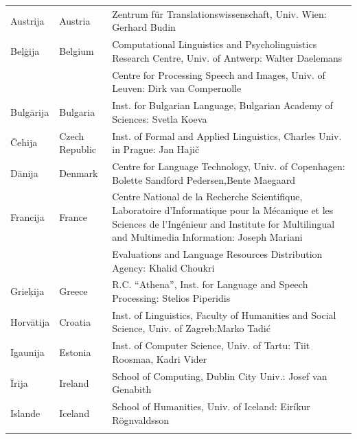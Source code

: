  \label{metanetmembers}
\small
\begin{longtable}{@{}llp{113mm}@{}}
  Austrija & \textcolor{grey1}{Austria} & Zentrum für Translationswissenschaft, Univ. Wien: Gerhard Budin\\ \addlinespace 
  Beļģija & \textcolor{grey1}{Belgium} & Computational Linguistics and Psycholinguistics Research Centre, Univ. of Antwerp: Walter Daelemans\\ \addlinespace
  & & Centre for Processing Speech and Images, Univ. of Leuven: Dirk van Compernolle \\ \addlinespace
  Bulgārija & \textcolor{grey1}{Bulgaria} & Inst. for Bulgarian Language, Bulgarian Academy of Sciences: Svetla Koeva \\ \addlinespace
  Čehija & \textcolor{grey1}{Czech Republic} & Inst. of Formal and Applied Linguistics, Charles Univ. in Prague: Jan Hajič \\ \addlinespace
  Dānija &  \textcolor{grey1}{Denmark} & Centre for Language Technology, Univ. of Copenhagen:  Bolette Sandford Pedersen,\newline Bente Maegaard\\ \addlinespace
  Francija & \textcolor{grey1}{France} & Centre National de la Recherche Scientifique, Laboratoire d'Informatique pour la Mécanique et les Sciences de l'Ingénieur and Institute for Multilingual and Multimedia Information: Joseph Mariani \\ \addlinespace
  & & Evaluations and Language Resources Distribution Agency: Khalid Choukri\\ \addlinespace 
  Grieķija & \textcolor{grey1}{Greece} & R.C. “Athena”, Inst. for Language and Speech Processing: Stelios Piperidis\\ \addlinespace
  Horvātija & \textcolor{grey1}{Croatia} & Inst. of Linguistics, Faculty of Humanities and Social Science, Univ. of Zagreb:\newline Marko Tadić \\ \addlinespace
  Igaunija & \textcolor{grey1}{Estonia} & Inst. of Computer Science, Univ. of Tartu: Tiit Roosmaa, Kadri Vider\\ \addlinespace
  Īrija & \textcolor{grey1}{Ireland} & School of Computing, Dublin City Univ.: Josef van Genabith\\ \addlinespace
  Islande & \textcolor{grey1}{Iceland} & School of Humanities, Univ. of Iceland: Eiríkur Rögnvaldsson\\ \addlinespace

\end{longtable}
